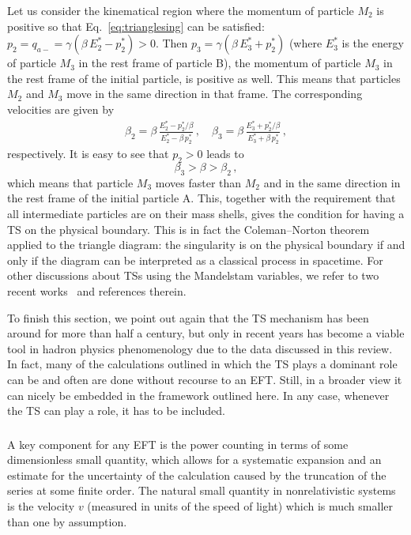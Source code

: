 Let us consider the kinematical region where the momentum of particle $M_2$ 
is positive so that Eq.~\eqref{eq:trianglesing} can be satisfied: $p_2 =q_{a-} 
= \gamma (\beta\,E_2^*-p_2^*) >0$. Then  $p_3=\gamma (\beta\,E_3^*+p_2^*)$ 
(where $E_3^*$ is the
energy of particle $M_3$ in the rest frame of particle B), the momentum of 
particle $M_3$ in the rest frame
of the initial particle, is positive as well.
This means that particles $M_2$ and $M_3$ move in the same direction in that 
frame. The corresponding velocities are given by
\begin{eqnarray}
  \beta_2 = \beta\, \frac{E_2^*-p_2^*/\beta}{E_2^*-\beta\, p_2^*}\,,\quad
  \beta_3 = \beta\, \frac{E_3^*+p_2^*/\beta}{E_3^*+\beta\, p_2^*}\,,
\end{eqnarray}
respectively. It is easy to see that $p_2>0$ leads to 
\begin{equation}
  \beta_3>\beta>\beta_2\,,
\end{equation}
which means that particle $M_3$ moves faster than $M_2$ and in the same 
direction in
the rest frame of the initial particle A.
%
This, together with the requirement that all intermediate particles are on their
mass shells, gives
the condition for having a TS on the physical boundary.
This is in fact the Coleman--Norton theorem~\cite{Coleman:1965xm} applied to the
triangle diagram:
the singularity is on the physical boundary if and only if the diagram can be 
interpreted as a classical process in spacetime. For other discussions about
TSs using the Mandelstam variables, we refer to two recent
works~\cite{Szczepaniak:2015eza,Liu:2015taa} and references therein.

To finish this section, we point out again that the TS mechanism has been around
for more than half a century, but only in recent years has become a viable tool
in hadron physics phenomenology due to the data discussed in this review. In
fact, many of the calculations outlined in which the TS plays a dominant role
can be and often are done without  recourse to an EFT. Still, in a broader view
it can nicely be embedded in the framework outlined here. In any case, whenever
the TS can play a role, it has to be included.

\subsubsection{\nreft}
\label{sec:nreft1}


A key component for any EFT is the power counting in terms of some dimensionless
small quantity, which allows for a systematic expansion and an estimate for the
uncertainty of the calculation caused by the truncation of the series at some
finite order. The natural small quantity in nonrelativistic systems is the
velocity $v$ (measured in units of the speed of light) which is much smaller
than one by assumption.

